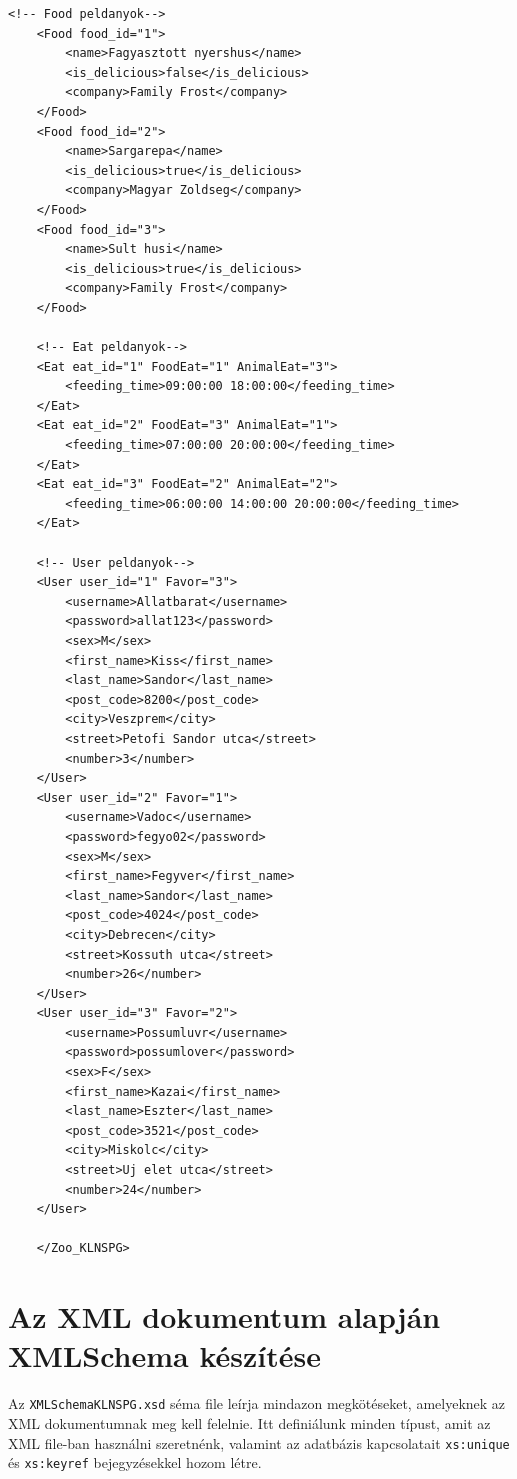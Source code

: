 \documentclass[12pt]{report}
\begin{document}
\begin{lstlisting}[caption={Az XML dokumentum}]
	<!-- Food peldanyok-->
	<Food food_id="1">
		<name>Fagyasztott nyershus</name>
		<is_delicious>false</is_delicious>
		<company>Family Frost</company>
	</Food>
	<Food food_id="2">
		<name>Sargarepa</name>
		<is_delicious>true</is_delicious>
		<company>Magyar Zoldseg</company>
	</Food>
	<Food food_id="3">
		<name>Sult husi</name>
		<is_delicious>true</is_delicious>
		<company>Family Frost</company>
	</Food>
	
	<!-- Eat peldanyok-->
	<Eat eat_id="1" FoodEat="1" AnimalEat="3">
		<feeding_time>09:00:00 18:00:00</feeding_time>
	</Eat>
	<Eat eat_id="2" FoodEat="3" AnimalEat="1">
		<feeding_time>07:00:00 20:00:00</feeding_time>
	</Eat>
	<Eat eat_id="3" FoodEat="2" AnimalEat="2">
		<feeding_time>06:00:00 14:00:00 20:00:00</feeding_time>
	</Eat>    
	
	<!-- User peldanyok-->
	<User user_id="1" Favor="3">
		<username>Allatbarat</username>
		<password>allat123</password>
		<sex>M</sex>
		<first_name>Kiss</first_name>
		<last_name>Sandor</last_name>
		<post_code>8200</post_code>
		<city>Veszprem</city>
		<street>Petofi Sandor utca</street>
		<number>3</number>
	</User>
	<User user_id="2" Favor="1">
		<username>Vadoc</username>
		<password>fegyo02</password>
		<sex>M</sex>
		<first_name>Fegyver</first_name>
		<last_name>Sandor</last_name>
		<post_code>4024</post_code>
		<city>Debrecen</city>
		<street>Kossuth utca</street>
		<number>26</number>
	</User>
	<User user_id="3" Favor="2">
		<username>Possumluvr</username>
		<password>possumlover</password>
		<sex>F</sex>
		<first_name>Kazai</first_name>
		<last_name>Eszter</last_name>
		<post_code>3521</post_code>
		<city>Miskolc</city>
		<street>Uj elet utca</street>
		<number>24</number>
	</User>
	
	</Zoo_KLNSPG>
\end{lstlisting}
\clearpage

\section{Az XML dokumentum alapján XMLSchema készítése}
\indent\indent Az \texttt{XMLSchemaKLNSPG.xsd} séma file leírja mindazon megkötéseket, amelyeknek az XML dokumentumnak meg kell felelnie. Itt definiálunk minden típust, amit az XML file-ban használni szeretnénk, valamint az adatbázis kapcsolatait \texttt{xs:unique} és \texttt{xs:keyref} bejegyzésekkel hozom létre.
\end{document}
